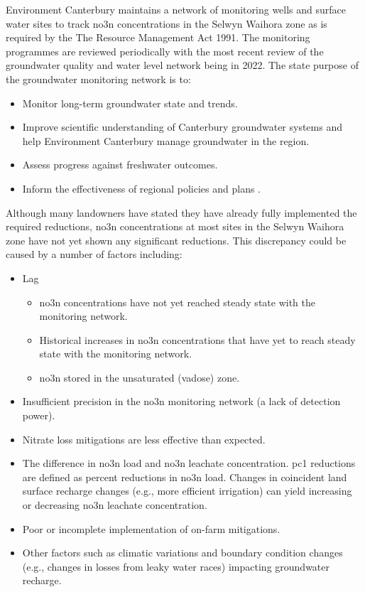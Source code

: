 Environment Canterbury maintains a network of monitoring wells and surface water sites to track \gls{no3n} concentrations in the Selwyn Waihora zone as is required by the The Resource Management Act 1991.
The monitoring programmes are reviewed periodically with the most recent review of the groundwater quality and water level network being in 2022.
The state purpose of the groundwater monitoring network is to:
\begin{itemize}
    \item Monitor long-term groundwater state and trends.
    \item Improve scientific understanding of Canterbury groundwater systems and help Environment Canterbury manage groundwater in the region.
    \item Assess progress against freshwater outcomes.
    \item Inform the effectiveness of regional policies and plans \citep{ecan_monitor_review}.
\end{itemize}

Although many landowners have stated they have already fully implemented the required reductions\citep{scottpc}, \gls{no3n} concentrations at most sites in the Selwyn Waihora zone have not yet shown any significant reductions\citep{scottpc}.
This discrepancy could be caused by a number of factors including:
\begin{itemize}
    \item Lag
    \begin{itemize}
        \item \gls{no3n} concentrations have not yet reached steady state with the monitoring network.
        \item Historical increases in \gls{no3n} concentrations that have yet to reach steady state with the monitoring network.
        \item \gls{no3n} stored in the unsaturated (vadose) zone.
    \end{itemize}
    \item Insufficient precision in the \gls{no3n} monitoring network (a lack of detection power).
    \item Nitrate loss mitigations are less effective than expected.
    \item The difference in \gls{no3n} load and \gls{no3n} leachate concentration. \gls{pc1} reductions are defined as percent reductions in \gls{no3n} load. Changes in coincident land surface recharge changes (e.g., more efficient irrigation) can yield increasing or decreasing \gls{no3n} leachate concentration.
    \item Poor or incomplete implementation of on-farm mitigations.
    \item Other factors such as climatic variations and boundary condition changes (e.g., changes in losses from leaky water races) impacting groundwater recharge.
\end{itemize}


